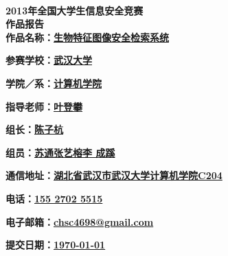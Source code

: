 
\newcommand{\prop}[3] {
  \Large \textsf{\textbf{#1：\underline {#2 \hspace{#3}}}}
}

\begin{titlepage}
  \begin{center}
    ~\\[3.3cm]
    \textsf{\Huge \textbf{2013年全国大学生信息安全竞赛}} \\[0.7cm]
    \textsf{\Huge \textbf{作品报告}} \\[6.5cm]

    \prop{作品名称}{生物特征图像安全检索系统}{3.7cm}
    \prop{参赛学校}{武汉大学}{8.6cm}
    \prop{学院／系}{计算机学院}{8.0cm}
    \prop{指导老师}{叶登攀}{9.2cm}
    \prop{组\hspace{1.2cm}长}{陈子杭}{9.2cm}
    \prop{组\hspace{1.2cm}员}{苏通\hspace{0.7cm}张艺榕\hspace{0.7cm}李
      成蹊}{4.7cm}
    \prop{通信地址}{湖北省武汉市武汉大学计算机学院C204}{0.2cm}
    \prop{电\hspace{1.2cm}话}{155 2702 5515}{6.9cm}
    \prop{电子邮箱}{chsc4698@gmail.com}{5.2cm}
    \prop{提交日期}{\today}{5.5cm}
  \end{center}
\end{titlepage}